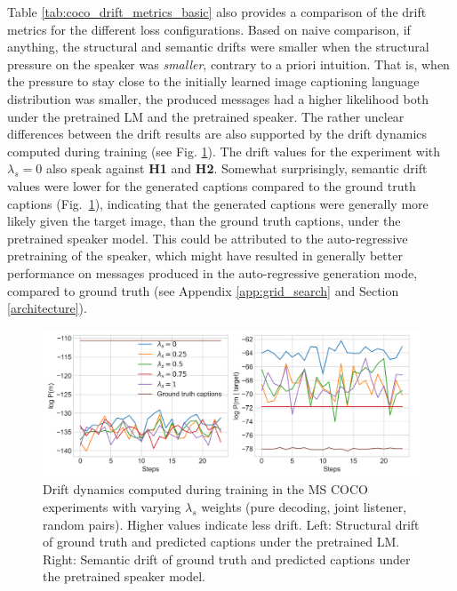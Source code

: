 Table \ref{tab:coco_drift_metrics_basic} also provides a comparison of the drift metrics for the different loss configurations. Based on naive comparison, if anything, the structural and semantic drifts were smaller when the structural pressure on the speaker was \emph{smaller}, contrary to a priori intuition. That is, when the pressure to stay close to the initially learned image captioning language distribution was smaller, the produced messages had a higher likelihood both under the pretrained LM and the pretrained speaker. The rather unclear differences between the drift results are also supported by the drift dynamics computed during training (see Fig. \ref{fig:coco_baseline_str_sem_drift_all}). 
The drift values for the experiment with $\lambda_s = 0$ also speak against \textbf{H1} and \textbf{H2}. Somewhat surprisingly, semantic drift values were lower for the generated captions compared to the ground truth captions (Fig.~\ref{fig:coco_baseline_str_sem_drift_all}), indicating that the generated captions were generally more likely given the target image, than the ground truth captions, under the pretrained speaker model. This could be attributed to the auto-regressive pretraining of the speaker, which might have resulted in generally better performance on messages produced in the auto-regressive generation mode, compared to ground truth (see Appendix \ref{app:grid_search} and Section \ref{architecture}).
\begin{figure}
	\centering
	\includegraphics[width=\linewidth]{images/coco_structural_semantic_drift_4000_pure_L_S_all_random.png}
	\caption{Drift dynamics computed during training in the MS COCO experiments with varying $\lambda_s$ weights (pure decoding, joint listener, random pairs). Higher values indicate less drift. Left: Structural drift of ground truth and predicted captions under the pretrained LM. Right: Semantic drift of ground truth and predicted captions under the pretrained speaker model.}
	\label{fig:coco_baseline_str_sem_drift_all}
\end{figure}

